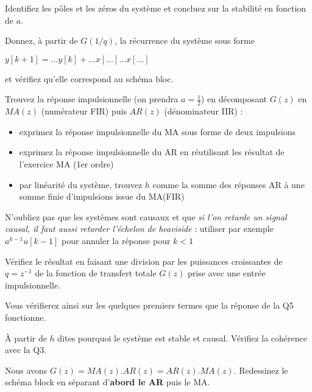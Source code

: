 Identifiez les pôles et les zéros du système et concluez sur la stabilité en fonction de $a$.

Donnez, à partir de $G(1/q)$, la récurrence  du système sous forme

$y[k+1]= \ldots y[k] + \ldots x[\ldots] \ldots x[\ldots]$

et vérifiez qu'elle correspond au schéma bloc.

Trouvez la réponse impulsionnelle (on prendra $a=\frac{1}{2}$) en décomposant $G(z)$ en $MA(z)$ (numérateur FIR) puis $AR(z)$ (dénominateur IIR) :
\begin{itemize}
\item exprimez la réponse impulsionnelle du MA sous forme de deux
  impulsions
\item exprimez la réponse impulsionnelle du AR en réutilisant
  les résultat de l'exercice MA (1er ordre)
\item par linéarité du
  système, trouvez $h$ comme la somme des réponses AR à une somme
  finie d'impulsions issue du MA(FIR)
\end{itemize}

\begin{remarque}
N'oubliez pas que les systèmes sont causaux et que \emph{si l'on
  retarde un signal causal, il faut aussi retarder l'échelon de
  heaviside} : utiliser par exemple $a^{k-1}u[k-1]$ pour annuler la
réponse pour $k<1$
\end{remarque}

Vérifiez le résultat en faisant une division par les puissances croissantes de $q = z^{-1}$ de la fonction de transfert totale $G(z)$ prise avec une entrée impulsionnelle. 

Vous vérifierez ainsi sur les quelques premiers termes que la réponse de la Q5 fonctionne.

À partir de $h$ dites pourquoi le système est stable et causal. Vérifiez la cohérence avec la Q3.



Nous avons $G(z) = MA(z).AR(z) = AR(z).MA(z)$.  
Redessinez le schéma block en séparant d'\textbf{abord le AR} puis le MA.  


